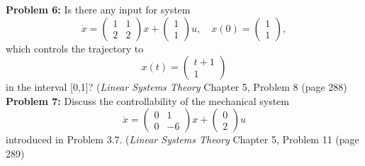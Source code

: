 \documentclass[12pt]{article}
\begin{document}
\noindent
\textbf{Problem 6:} Is there any input for system 
$$ \dot{x}=
\begin{pmatrix}
1 & 1 \\
2 & 2
\end{pmatrix} x + 
\begin{pmatrix}
1 \\
1
\end{pmatrix}u,\quad x(0)=
\begin{pmatrix}
1 \\
1
\end{pmatrix},$$
which controls the trajectory to 
$$x(t)=\begin{pmatrix}
t + 1 \\
1
\end{pmatrix}
$$
in the interval [0,1]? ({\em Linear Systems Theory} Chapter 5, Problem 8 (page 288)\\

\noindent
\textbf{Problem 7:} Discuss the controllability of the mechanical system
$$\dot{x}=
\begin{pmatrix}
	0 & 1 \\
	0 & -6
\end{pmatrix}	
x + 
\begin{pmatrix}
0 \\
2
\end{pmatrix} u
$$
introduced in Problem 3.7. ({\em Linear Systems Theory} Chapter 5, Problem 11 (page 289)
\end{document}
